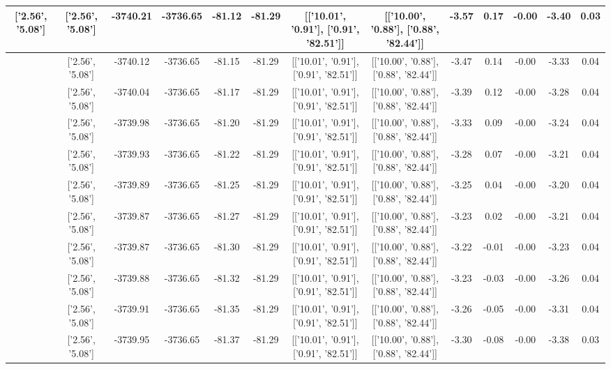 \begin{table}[htbp]
\begin{adjustbox}{angle=90}
\begin{tabular}{|c|c|c|c|c|c|c|c|c|c|c|c|c|}
 ['2.56', '5.08'] & ['2.56', '5.08'] & -3740.21 & -3736.65 & -81.12 & -81.29 & [['10.01', '0.91'], ['0.91', '82.51']] & [['10.00', '0.88'], ['0.88', '82.44']] & -3.57 & 0.17 & -0.00 & -3.40 & 0.03\\ \hline
 ['2.56', '5.08'] & ['2.56', '5.08'] & -3740.12 & -3736.65 & -81.15 & -81.29 & [['10.01', '0.91'], ['0.91', '82.51']] & [['10.00', '0.88'], ['0.88', '82.44']] & -3.47 & 0.14 & -0.00 & -3.33 & 0.04\\ \hline
 ['2.56', '5.08'] & ['2.56', '5.08'] & -3740.04 & -3736.65 & -81.17 & -81.29 & [['10.01', '0.91'], ['0.91', '82.51']] & [['10.00', '0.88'], ['0.88', '82.44']] & -3.39 & 0.12 & -0.00 & -3.28 & 0.04\\ \hline
 ['2.56', '5.08'] & ['2.56', '5.08'] & -3739.98 & -3736.65 & -81.20 & -81.29 & [['10.01', '0.91'], ['0.91', '82.51']] & [['10.00', '0.88'], ['0.88', '82.44']] & -3.33 & 0.09 & -0.00 & -3.24 & 0.04\\ \hline
 ['2.56', '5.08'] & ['2.56', '5.08'] & -3739.93 & -3736.65 & -81.22 & -81.29 & [['10.01', '0.91'], ['0.91', '82.51']] & [['10.00', '0.88'], ['0.88', '82.44']] & -3.28 & 0.07 & -0.00 & -3.21 & 0.04\\ \hline
 ['2.56', '5.08'] & ['2.56', '5.08'] & -3739.89 & -3736.65 & -81.25 & -81.29 & [['10.01', '0.91'], ['0.91', '82.51']] & [['10.00', '0.88'], ['0.88', '82.44']] & -3.25 & 0.04 & -0.00 & -3.20 & 0.04\\ \hline
 ['2.56', '5.08'] & ['2.56', '5.08'] & -3739.87 & -3736.65 & -81.27 & -81.29 & [['10.01', '0.91'], ['0.91', '82.51']] & [['10.00', '0.88'], ['0.88', '82.44']] & -3.23 & 0.02 & -0.00 & -3.21 & 0.04\\ \hline
 ['2.56', '5.08'] & ['2.56', '5.08'] & -3739.87 & -3736.65 & -81.30 & -81.29 & [['10.01', '0.91'], ['0.91', '82.51']] & [['10.00', '0.88'], ['0.88', '82.44']] & -3.22 & -0.01 & -0.00 & -3.23 & 0.04\\ \hline
 ['2.56', '5.09'] & ['2.56', '5.08'] & -3739.88 & -3736.65 & -81.32 & -81.29 & [['10.01', '0.91'], ['0.91', '82.51']] & [['10.00', '0.88'], ['0.88', '82.44']] & -3.23 & -0.03 & -0.00 & -3.26 & 0.04\\ \hline
 ['2.57', '5.09'] & ['2.56', '5.08'] & -3739.91 & -3736.65 & -81.35 & -81.29 & [['10.01', '0.91'], ['0.91', '82.51']] & [['10.00', '0.88'], ['0.88', '82.44']] & -3.26 & -0.05 & -0.00 & -3.31 & 0.04\\ \hline
 ['2.57', '5.09'] & ['2.56', '5.08'] & -3739.95 & -3736.65 & -81.37 & -81.29 & [['10.01', '0.91'], ['0.91', '82.51']] & [['10.00', '0.88'], ['0.88', '82.44']] & -3.30 & -0.08 & -0.00 & -3.38 & 0.03\\ \hline

\end{tabular}
\end{adjustbox}
\end{table}

